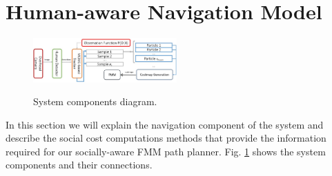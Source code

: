 \section{Human-aware Navigation Model}
\label{social_nav}



\begin{figure}
\centering
{\includegraphics[width=0.49\textwidth]{pictures/block.jpg}}
\caption{System components diagram.}
\label{fig:block}
\end{figure}


In this section we will explain the navigation component of the system and describe the social cost computations methods that provide the information required for our socially-aware FMM path planner. Fig. \ref{fig:block} shows the system components and their connections.



